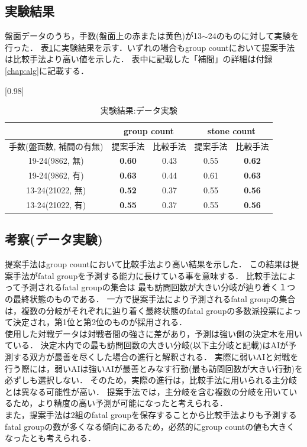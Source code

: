 \subsection{実験結果}
盤面データのうち，手数(盤面上の赤または黄色)が13$\sim$24のものに対して実験を行った．
表\ref{table:result-online}に実験結果を示す．いずれの場合もgroup countにおいて提案手法は比較手法より高い値を示した．
表中に記載した「補間」の詳細は付録\ref{chap:alg}に記載する．
\begin{table}[H]
	\caption{実験結果:データ実験}
	\centering
	\scalebox{0.98}[0.98]{
		\begin{tabular}{c|c|c|c|c}
			\multicolumn{1}{c}{} & \multicolumn{2}{|c|}{group count} 
			& \multicolumn{2}{c|}{stone count}\\ \hline \hline
			手数(盤面数, 補間の有無)    & 提案手法 & 比較手法 & 提案手法 & 比較手法 \\ \hline
			19-24(9862, 無)    & \bf{0.60} & 0.43 & 0.55 & \bf{0.62} \\
			19-24(9862, 有)    & \bf{0.63} & 0.44 & 0.61 & \bf{0.63}  \\
			13-24(21022, 無)   & \bf{0.52} & 0.37 & 0.55 & \bf{0.56}  \\
			13-24(21022, 有)   & \bf{0.55} & 0.37 & 0.55 & \bf{0.56}  \\
		\end{tabular}
	}
	\label{table:result-online}
\end{table}
\subsection{考察(データ実験)}
提案手法はgroup countにおいて比較手法より高い結果を示した．
この結果は提案手法がfatal groupを予測する能力に長けている事を意味する．
比較手法によって予測されるfatal groupの集合は
最も訪問回数が大きい分岐が辿り着く１つの最終状態のものである．
一方で提案手法により予測されるfatal groupの集合は，複数の分岐がそれぞれに辿り着く最終状態のfatal groupの多数派投票によって決定され，第1位と第2位のものが採用される．\\
使用した対戦データは対戦者間の強さに差があり，予測は強い側の決定木を用いている．
決定木内での最も訪問回数の大きい分岐(以下主分岐と記載)はAIが予測する双方が最善を尽くした場合の進行と解釈される．
実際に弱いAIと対戦を行う際には，弱いAIは強いAIが最善とみなす行動(最も訪問回数が大きい行動)を必ずしも選択しない．
そのため，実際の進行は，比較手法に用いられる主分岐とは異なる可能性が高い．
提案手法では，主分岐を含む複数の分岐を用いているため，より精度の高い予測が可能になったと考えられる．\\
また，提案手法は2組のfatal groupを保存することから比較手法よりも予測するfatal groupの数が多くなる傾向にあるため，必然的にgroup countの値も大きくなったとも考えられる．


